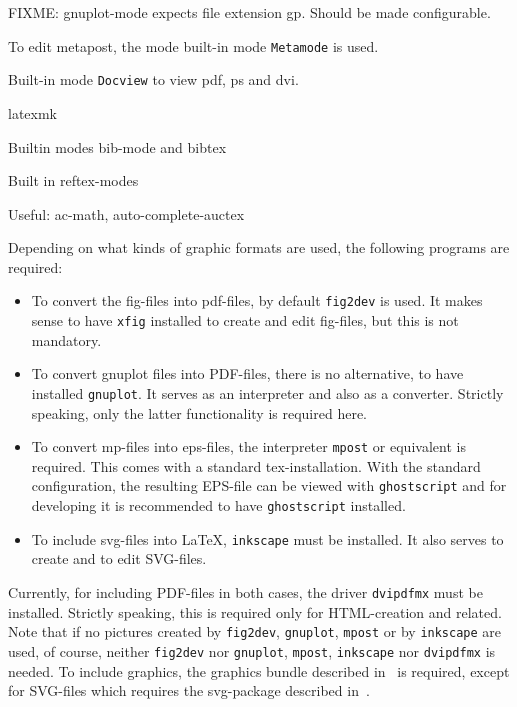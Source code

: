 FIXME\@: gnuplot-mode expects file extension gp. 
Should be made configurable. 

To edit metapost, the mode built-in mode \texttt{Metamode} is used. 

Built-in mode \texttt{Docview} to view pdf, ps and dvi. 

latexmk

Builtin modes bib-mode and bibtex

Built in reftex-modes

Useful: 
ac-math, auto-complete-auctex

Depending on what kinds of graphic formats are used, 
the following programs are required: 
%
\begin{itemize}
\item
To convert the \gls{fig}-files into \gls{pdf}-files, 
by default \texttt{fig2dev} is used. 
It makes sense to have \texttt{xfig} installed 
to create and edit fig-files, but this is not mandatory. 
\item
To convert gnuplot files into PDF-files, there is no alternative, 
to have installed \texttt{gnuplot}. 
It serves as an interpreter and also as a converter. 
Strictly speaking, only the latter functionality is required here. 
\item
To convert \gls{mp}-files into \gls{eps}-files, 
the interpreter \texttt{mpost} or equivalent is required. 
This comes with a standard tex-installation. 
With the standard configuration, 
the resulting EPS-file can be viewed with \texttt{ghostscript} 
and for developing it is recommended to have \texttt{ghostscript} installed. 
\item
To include \gls{svg}-files into \LaTeX{}, 
\texttt{inkscape} must be installed. 
It also serves to create and to edit SVG-files. 
\end{itemize}


Currently, for including PDF-files in both cases, 
the driver \texttt{dvipdfmx} must be installed. 
Strictly speaking, this is required only for HTML-creation and related. 
Note that if no pictures created by \texttt{fig2dev}, \texttt{gnuplot}, 
\texttt{mpost} or by \texttt{inkscape} are used, of course, 
neither \texttt{fig2dev} nor \texttt{gnuplot},
\texttt{mpost}, \texttt{inkscape} 
nor \texttt{dvipdfmx} is needed. 
To include graphics, the graphics bundle described in~\cite{GraX} is required, 
except for SVG-files which requires the svg-package 
described in~\cite{SvgP}. 

